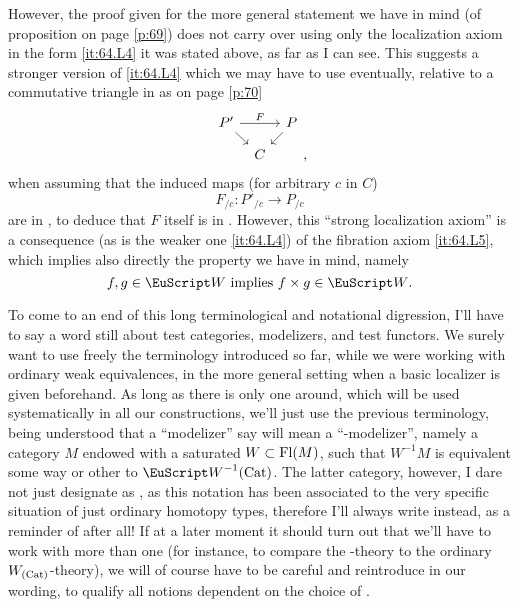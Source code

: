 However, the proof given for the more general statement we have in
mind (of proposition on page \ref{p:69}) does not carry over using
only the localization axiom in the form \ref{it:64.L4} it was stated
above, as far as I can see. This suggests a stronger version
 of \ref{it:64.L4} which we may have
to use eventually, relative to a commutative triangle in \Cat{} as on
page \ref{p:70}
\[\begin{tikzcd}[baseline=(O.base),column sep=tiny,row sep=small]
  P' \ar[dr]\ar[rr,"F"] & & P\ar[dl] \\ & |[alias=O]| C &
\end{tikzcd},\]
when assuming that the induced maps (for arbitrary $c$ in $C$)
\[F_{/c}: P'_{/c}\to P_{/c}\]
are in \scrW, to deduce that $F$ itself is in \scrW. However, this
``strong localization axiom'' is a consequence (as is the weaker one
\ref{it:64.L4}) of the fibration axiom \ref{it:64.L5}, which implies
also directly the property we have in mind, namely
\[\text{$f,g\in\scrW$ implies $f\times g\in\scrW$.}\]

To come to an end of this long terminological and
notational digression, I'll have to say a word still about test
categories, modelizers, and test functors. We surely want to use
freely the terminology introduced so far, while we were working with
ordinary weak equivalences, in the more general setting when a basic
localizer \scrW{} is given beforehand. As long as there is only one
\scrW{} around, which will be used systematically in all our
constructions, we'll just use the previous terminology, being
understood that a ``modelizer'' say will mean a ``\scrW-modelizer'',
namely a category $M$ endowed with a saturated $W\subset\operatorname{Fl}(M)$, such
that $W^{-1}M$ is equivalent some way or other to
$\scrW^{-1}\Cat$. The latter category, however, I dare not just
designate as \Hot, as this notation has been associated to the very
specific situation of just ordinary homotopy types, therefore I'll
always write \HotW{} instead, as a reminder of \scrW{} after all! If
at a later moment it should turn out that we'll have to work with more
than one \scrW{} (for instance, to compare the \scrW-theory to the
ordinary $W_{(\mathrm{Cat})}$-theory), we will of course have to be careful and
reintroduce \scrW{} in our wording, to qualify all notions dependent
on the choice of \scrW.

\bigbreak
\presectionfill{}\par

